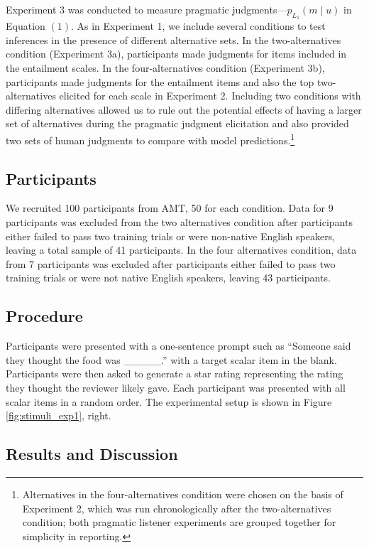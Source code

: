 \documentclass[10pt, letterpaper]{article}
\begin{document}
Experiment 3 was conducted to measure pragmatic
judgments---\(p_{L_1}(m \mid u)\) in Equation \((1)\). As in Experiment
1, we include several conditions to test inferences in the presence of
different alternative sets. In the two-alternatives condition
(Experiment 3a), participants made judgments for items included in the
entailment scales. In the four-alternatives condition (Experiment 3b),
participants made judgments for the entailment items and also the top
two-alternatives elicited for each scale in Experiment 2. Including two
conditions with differing alternatives allowed us to rule out the
potential effects of having a larger set of alternatives during the
pragmatic judgment elicitation and also provided two sets of human
judgments to compare with model
predictions.\footnote{Alternatives in the four-alternatives condition were chosen on the basis of Experiment 2, which was run chronologically after the two-alternatives condition; both pragmatic listener experiments are grouped together for simplicity in reporting.}

\subsection{Participants}\label{participants-2}

We recruited 100 participants from AMT, 50 for each condition. Data for
9 participants was excluded from the two alternatives condition after
participants either failed to pass two training trials or were
non-native English speakers, leaving a total sample of 41 participants.
In the four alternatives condition, data from 7 participants was
excluded after participants either failed to pass two training trials or
were not native English speakers, leaving 43 participants.

\subsection{Procedure}\label{procedure}

Participants were presented with a one-sentence prompt such as ``Someone
said they thought the food was \_\_\_\_\_.'' with a target scalar item
in the blank. Participants were then asked to generate a star rating
representing the rating they thought the reviewer likely gave. Each
participant was presented with all scalar items in a random order. The
experimental setup is shown in Figure \ref{fig:stimuli_exp1}, right.

\subsection{Results and Discussion}\label{results-and-discussion-2}
\end{document}
